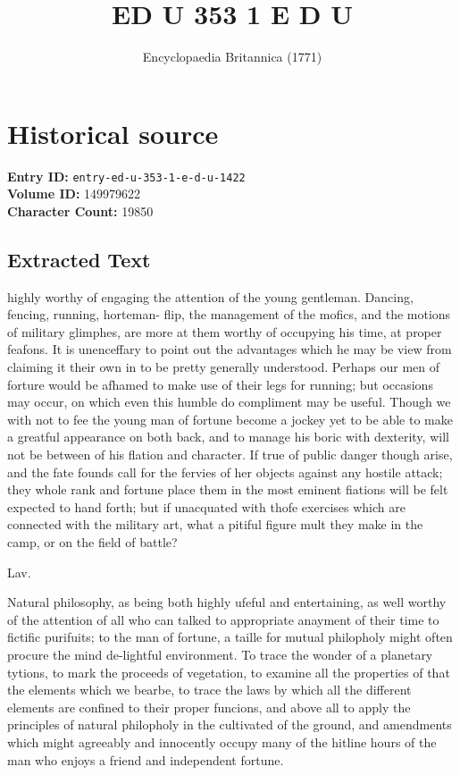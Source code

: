 \documentclass{article}
\title{ED U  353 1 E D U}
\date{Encyclopaedia Britannica (1771)}
\begin{document}
\maketitle

\section*{Historical source}
\textbf{Entry ID:} \texttt{entry-ed-u-353-1-e-d-u-1422} \\
\textbf{Volume ID:} 149979622 \\
\textbf{Character Count:} 19850

\subsection*{Extracted Text}
highly worthy of engaging the attention of the young gentleman. Dancing, fencing, running, horteman- flip, the management of the mofics, and the motions of military glimphes, are more at them worthy of occupying his time, at proper feafons. It is unenceffary to point out the advantages which he may be view from claiming it their own in to be pretty generally understood. Perhaps our men of forture would be afhamed to make use of their legs for running; but occasions may occur, on which even this humble do compliment may be useful. Though we with not to fee the young man of fortune become a jockey yet to be able to make a greatful appearance on both back, and to manage his boric with dexterity, will not be between of his flation and character. If true of public danger though arise, and the fate founds call for the fervies of her objects against any hostile attack; they whole rank and fortune place them in the most eminent fiations will be felt expected to hand forth; but if unacquated with thofe exercises which are connected with the military art, what a pitiful figure mult they make in the camp, or on the field of battle?

Lav.

Natural philosophy, as being both highly ufeful and entertaining, as well worthy of the attention of all who can talked to appropriate anayment of their time to fictific purifuits; to the man of fortune, a taille for mutual philopholy might often procure the mind de-lightful environment. To trace the wonder of a planetary tytions, to mark the proceeds of vegetation, to examine all the properties of that the elements which we bearbe, to trace the laws by which all the different elements are confined to their proper funcions, and above all to apply the principles of natural philopholy in the cultivated of the ground, and amendments which might agreeably and innocently occupy many of the hitline hours of the man who enjoys a friend and independent fortune.
\end{document}
